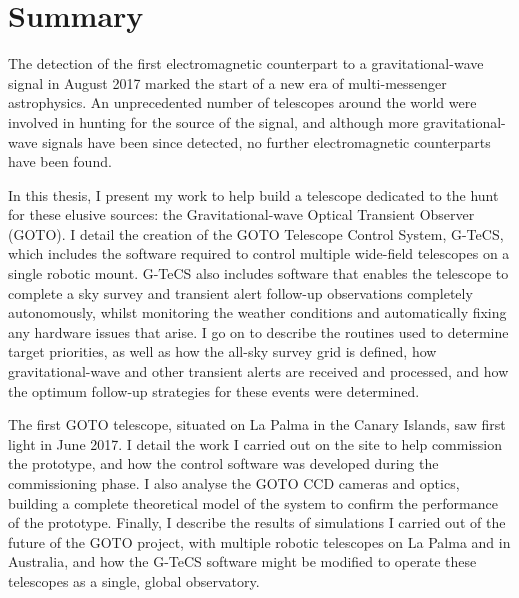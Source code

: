 \chapter*{Summary}

\begin{onehalfspace}

The detection of the first electromagnetic counterpart to a gravitational-wave signal in August 2017 marked the start of a new era of multi-messenger astrophysics. An unprecedented number of telescopes around the world were involved in hunting for the source of the signal, and although more gravitational-wave signals have been since detected, no further electromagnetic counterparts have been found.

In this thesis, I present my work to help build a telescope dedicated to the hunt for these elusive sources: the Gravitational-wave Optical Transient Observer (GOTO). I detail the creation of the GOTO Telescope Control System, G-TeCS, which includes the software required to control multiple wide-field telescopes on a single robotic mount. G-TeCS also includes software that enables the telescope to complete a sky survey and transient alert follow-up observations completely autonomously, whilst monitoring the weather conditions and automatically fixing any hardware issues that arise. I go on to describe the routines used to determine target priorities, as well as how the all-sky survey grid is defined, how gravitational-wave and other transient alerts are received and processed, and how the optimum follow-up strategies for these events were determined.

The first GOTO telescope, situated on La Palma in the Canary Islands, saw first light in June 2017. I detail the work I carried out on the site to help commission the prototype, and how the control software was developed during the commissioning phase. I also analyse the GOTO CCD cameras and optics, building a complete theoretical model of the system to confirm the performance of the prototype. Finally, I describe the results of simulations I carried out of the future of the GOTO project, with multiple robotic telescopes on La Palma and in Australia, and how the G-TeCS software might be modified to operate these telescopes as a single, global observatory.

\end{onehalfspace}
